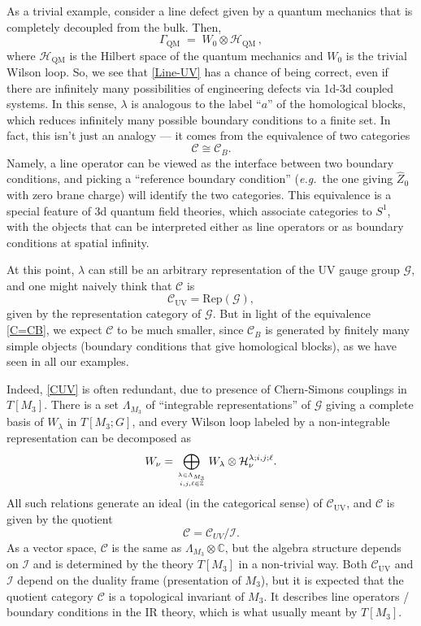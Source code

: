 \documentclass[hyper,letterpaper]{JHEP3}
\newcommand{\be}{\begin{equation}}
\newcommand{\ee}{\end{equation}}
\newcommand{\Z}{{\mathbb Z}}
\newcommand{\C}{{\mathbb C}}
\renewcommand{\hat}{\widehat}
\def\CC{{\mathcal C}}
\def\CG{{\mathcal G}}
\def\CH{{\mathcal H}}
\def\CI{{\mathcal I}}
\def\eg{{\textit{e.g.}}}
\begin{document}
As a trivial example, consider a line defect given by a quantum mechanics that is completely decoupled from the bulk. Then,
\be
\Gamma_{\text{QM}} \; = \; W_0\otimes \CH_{\text{QM}} \,,
\label{babyexmpl}
\ee
where $\CH_{\text{QM}}$ is the Hilbert space of the quantum mechanics and $W_0$ is the trivial Wilson loop. So, we see that \eqref{Line-UV} has a chance of being correct, even if there are infinitely many possibilities of engineering defects via 1d-3d coupled systems. In this sense, $\lambda$ is analogous to the label ``$a$'' of the homological blocks, which reduces infinitely many possible boundary conditions to a finite set. In fact, this isn't just an analogy --- it comes from the equivalence of two categories
\be\label{C=CB}
\CC\cong \CC_B.
\ee
Namely, a line operator can be viewed as the interface between two boundary conditions, and picking a ``reference boundary condition'' (\eg~the one giving $\hat{Z}_0$ with zero brane charge) will identify the two categories. This equivalence is a special feature of 3d quantum field theories, which associate categories to $S^1$, with the objects that can be interpreted either as line operators or as boundary conditions at spatial infinity.

At this point, $\lambda$ can still be an arbitrary representation of the UV gauge group $\CG$, and one might naively think that $\CC$ is
\be\label{CUV}
\CC_{\text{UV}}=\mathrm{Rep}(\CG),
\ee
given by the representation category of $\CG$. But in light of the equivalence \eqref{C=CB}, we expect $\CC$ to be much smaller, since $\CC_B$ is generated by finitely many simple objects (boundary conditions that give homological blocks), as we have seen in all our examples.

Indeed, \eqref{CUV} is often redundant, due to presence of Chern-Simons couplings in $T[M_3]$. There is a set $\Lambda_{M_3}$ of ``integrable representations'' of $\CG$ giving a complete basis of $W_\lambda$ in $T[M_3;G]$, and every Wilson loop labeled by a non-integrable representation can be decomposed as
\be\label{WilsonDec}
W_{\nu}=\bigoplus_{\lambda\in \Lambda_{M_3}\atop i,j,\ell\in\Z}W_{\lambda}\otimes \CH_{\nu}^{\lambda;i,j;\ell}.
\ee
All such relations generate an ideal (in the categorical sense) of $\CC_{\text{UV}}$, and $\CC$ is given by the quotient
\begin{equation}
	\CC=\CC_{UV}/\CI. 	
\end{equation}
As a vector space, $\CC$ is the same as $\Lambda_{M_3}\otimes\C$, but the algebra structure depends on $\CI$ and is determined by the theory $T[M_3]$ in a non-trivial way. Both $\CC_{\text{UV}}$ and $\CI$ depend on the duality frame (presentation of $M_3$), but it is expected that the quotient category $\CC$ is a topological invariant of $M_3$. It describes line operators / boundary conditions in the IR theory, which is what usually meant by $T[M_3]$.
\end{document}
